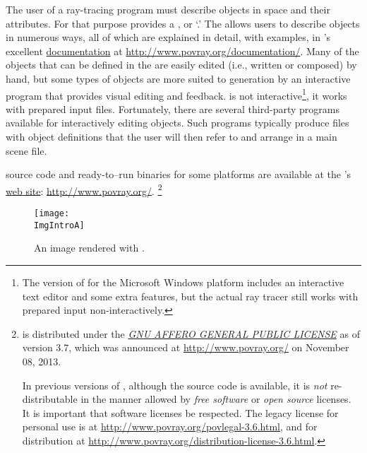 The user of a ray-tracing program must describe objects in space
and their attributes. For that purpose \IXpov{} provides a
, or `.'
The 
allows users to describe objects in numerous ways, all of which
are explained in detail, with examples, in \IXpov{}'s
excellent \href{http://www.povray.org/documentation/}{documentation}
at \url{http://www.povray.org/documentation/}.
Many of the objects that can be defined in the  are easily
edited (i.e., written or composed) by hand, but some types of objects
are more suited to generation by an interactive program that
provides visual editing and feedback. \IXpov{} is not
interactive\footnote{The version of \IXpov{} for the
Microsoft Windows platform includes an interactive text editor and
some extra features, but the actual ray tracer still works
with prepared input non-interactively.},
it works with prepared input files. Fortunately, there are several
third-party programs available for interactively editing
\IXpov{}  objects. Such programs typically
produce  files with object definitions
that the user will then refer to and arrange in a main scene file.

\IXpov{} source code and
ready-to--run binaries for some platforms are available at
the \IXpov's \href{http://www.povray.org/}{web site}:
\url{http://www.povray.org/}.
\footnote{\IXpov{} is distributed under the
\href{http://www.povray.org/povlegal.html}
{\emph{GNU AFFERO GENERAL PUBLIC LICENSE}}
as of version 3.7,
which was announced at \url{http://www.povray.org/} on
November 08, 2013.

In previous versions of \IXpov{}, although the source code is available,
it is \emph{not} re-distributable in the manner allowed
by \emph{free software} or \emph{open source} licenses.
It is important that software licenses be respected.
The \IXpov{} legacy license for personal use is at
\url{http://www.povray.org/povlegal-3.6.html}, and for distribution
at \url{http://www.povray.org/distribution-license-3.6.html}.}

\begin{figure}[htb]
\centering
\texttt{[image: \\ImgIntroA]}
\caption{An image rendered with \dtypov.}
\label{fig:pov_image_Intro_0}
\end{figure}


